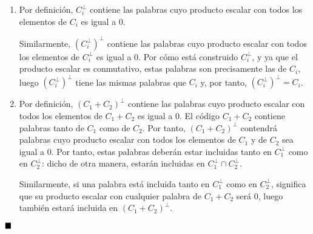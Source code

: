 \begin{enumerate}[label=\alph*)]
	\item Por definición, $C_i^\perp$ contiene las palabras cuyo producto escalar con todos los elementos de $C_i$ es igual a 0.
	
	Similarmente, $(C_i^\perp)^\perp$ contiene las palabras cuyo producto escalar con todos los elementos de $C_i^\perp$ es igual a 0. Por cómo está construido $C_i^\perp$, y ya que el producto escalar es conmutativo, estas palabras son precisamente las de $C_i$, luego $(C_i^\perp)^\perp$ tiene las mismas palabras que $C_i$ y, por tanto, $(C_i^\perp)^\perp = C_i$.
	
	\item Por definición, $(C_1 + C_2)^\perp$ contiene las palabras cuyo producto escalar con todos los elementos de $C_1 + C_2$ es igual a 0. El código $C_1 + C_2$ contiene palabras tanto de $C_1$ como de $C_2$. Por tanto, $(C_1 + C_2)^\perp$ contendrá palabras cuyo producto escalar con todos los elementos de $C_1$ y de $C_2$ sea igual a 0. Por tanto, estas palabras deberán estar incluidas tanto en $C_1^\perp$ como en $C_2^\perp$: dicho de otra manera, estarán incluidas en $C_1^\perp \cap C_2^\perp$.
	
	Similarmente, si una palabra está incluida tanto en $C_1^\perp$ como en $C_2^\perp$, significa que su producto escalar con cualquier palabra de $C_1 + C_2$ será 0, luego también estará incluida en $(C_1 + C_2)^\perp$.
\end{enumerate}

$\qed$
